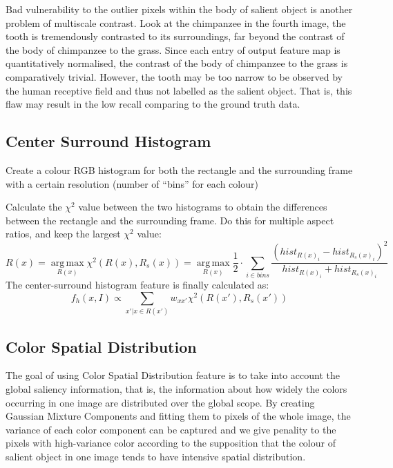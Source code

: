 \documentclass[10pt,twocolumn,letterpaper]{article}
\DeclareMathOperator*{\argmax}{arg\,max}
\newcommand{\SUM}{\sum\limits}
\begin{document}
Bad vulnerability to the outlier pixels within the body of salient object is another problem of multiscale contrast. 
Look at the chimpanzee in the fourth image, the tooth is tremendously contrasted to its surroundings,
far beyond the contrast of the body of chimpanzee to the grass. Since each entry of output feature map 
is quantitatively normalised, the contrast of the body of chimpanzee to the grass is comparatively trivial.
However, the tooth may be too narrow to be observed by the human receptive field and thus not 
labelled as the salient object. That is, this flaw may result in the low recall comparing to the ground truth data.%

\subsection{Center Surround Histogram}
Create a colour RGB histogram for both the rectangle and the surrounding frame with a certain resolution (number of ``bins'' for each colour)

    Calculate the $\chi^2$ value between the two histograms to obtain the differences between the rectangle and the surrounding frame.  Do this for multiple aspect ratios, and keep the largest $\chi^2$ value: %
    $$
    R(x) = \argmax\limits_{R(x)}\chi^2(R(x), R_s(x)) =\argmax\limits_{R(x)}\frac{1}{2}\cdot\SUM_{i\in bins}\frac{(hist_{R(x)_i}-hist_{R_s(x)_i})^2}{hist_{R(x)_i}+hist_{R_s(x)_i}}
    $$
    The center-surround histogram feature is finally calculated as:
    $$
    f_h(x,I)\propto\SUM_{x'|x\in R(x')}w_{xx'}\chi^2(R(x'),R_s(x'))
    $$

\subsection{Color Spatial Distribution}
    The goal of using Color Spatial Distribution feature is to take into account the global saliency information, 
    that is, the information about how widely the colors occurring in one image are distributed over the global scope.
    By creating Gaussian Mixture Components and fitting them to pixels of the whole image, the
    variance of each color component can be captured and we give penality to the pixels with high-variance 
    color according to the supposition that the colour of salient object in one image tends to have 
    intensive spatial distribution.
    
\end{document}
